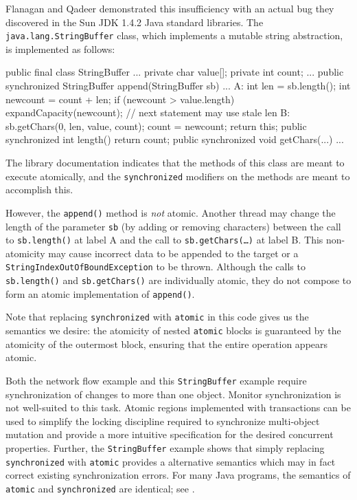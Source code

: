 Flanagan and Qadeer \cite{FlanaganQa03} demonstrated this
insufficiency with an
actual bug they discovered in the Sun JDK 1.4.2 Java standard
libraries.  The \texttt{java.lang.StringBuffer} class,
which implements a mutable string abstraction, is implemented as follows:
\begin{inlinecode}
public final class StringBuffer ... {
  private char value[];
  private int count;
  ... 
  public synchronized
  StringBuffer append(StringBuffer sb) {
    ...
A:  int len = sb.length();
    int newcount = count + len; 
    if (newcount > value.length)
      expandCapacity(newcount);
    // next statement may use stale len
B:  sb.getChars(0, len, value, count);
    count = newcount;
    return this;
  }
  public synchronized int length() { return count; }
  public synchronized void getChars(...) { ... }
}
\end{inlinecode}

The library documentation indicates that the methods of this class are meant
to execute atomically, and the {\tt synchronized} modifiers on the
methods are meant to accomplish this.

However, the {\tt append()} method is \emph{not} atomic.  Another
thread may change the length of the parameter \texttt{sb} (by adding
or removing characters) between the call to \texttt{sb.length()} at
label A and the call to \texttt{sb.getChars(\ldots)} at label B.
This non-atomicity may cause incorrect data to be appended to the
target or a \texttt{StringIndexOutOfBoundException} to be thrown. 
Although the calls to
\texttt{sb.length()} and \texttt{sb.getChars()} are individually
atomic, they do not compose to form an atomic implementation of
\texttt{append()}.  

Note that replacing {\tt synchronized} with {\tt atomic} in
this code gives us the semantics
we desire: the atomicity of nested {\tt atomic} blocks is guaranteed
by the atomicity of the outermost block, ensuring that the entire
operation appears atomic.

Both the network flow example and this {\tt StringBuffer} example require
synchronization of
changes to more than one object.
Monitor synchronization is not
well-suited to this task.  Atomic regions implemented with
transactions can be used to simplify the locking discipline required
to synchronize multi-object mutation
and provide a more intuitive specification for the desired
concurrent properties.  Further, the {\tt StringBuffer} example shows
that simply replacing {\tt synchronized} with {\tt atomic} provides a
alternative semantics which may in fact correct existing
synchronization errors.
For many Java programs, the
semantics of {\tt atomic} and {\tt synchronized} are identical; see
.

